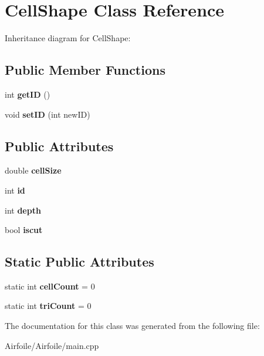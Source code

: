 \hypertarget{class_cell_shape}{}\section{Cell\+Shape Class Reference}
\label{class_cell_shape}


Inheritance diagram for Cell\+Shape\+:
\subsection*{Public Member Functions}
\begin{DoxyCompactItemize}
\item 
\mbox{\label{class_cell_shape_ad4ddac3ed3a455aa5731a78aed48f38e}} 
int {\bfseries get\+ID} ()
\item 
\mbox{\label{class_cell_shape_a188fd0e1d6ffdf9517a697b69c72bc7e}} 
void {\bfseries set\+ID} (int new\+ID)
\end{DoxyCompactItemize}
\subsection*{Public Attributes}
\begin{DoxyCompactItemize}
\item 
\mbox{\label{class_cell_shape_af05d6622bd94c5bc597a7fb5cc6399b0}} 
double {\bfseries cell\+Size}
\item 
\mbox{\label{class_cell_shape_a7966130d8cb338b65e6e31aa75dd2ce8}} 
int {\bfseries id}
\item 
\mbox{\label{class_cell_shape_a5fb295a7ab078ef767468cdd0208a3e7}} 
int {\bfseries depth}
\item 
\mbox{\label{class_cell_shape_a68d1a6e7cefa94a2a86296004f4e7d3f}} 
bool {\bfseries iscut}
\end{DoxyCompactItemize}
\subsection*{Static Public Attributes}
\begin{DoxyCompactItemize}
\item 
\mbox{\label{class_cell_shape_a530a1658e99d705a12cf4fddbadcb482}} 
static int {\bfseries cell\+Count} = 0
\item 
\mbox{\label{class_cell_shape_a39a5743173f0499ff942d76c1ccae2b3}} 
static int {\bfseries tri\+Count} = 0
\end{DoxyCompactItemize}


The documentation for this class was generated from the following file\+:\begin{DoxyCompactItemize}
\item 
Airfoile/\+Airfoile/main.\+cpp\end{DoxyCompactItemize}
